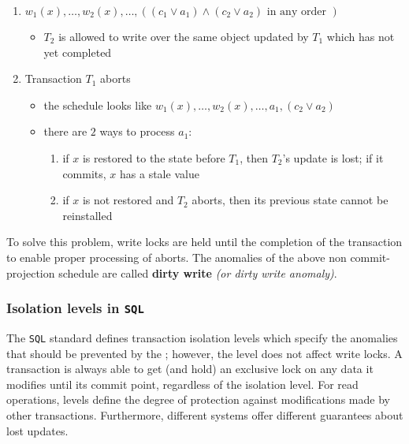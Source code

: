 \documentclass[english]{article}
\begin{document}
\begin{enumerate}
  \item \(w_1(x), \ldots, w_2(x), \ldots, \left( \left( c_1 \lor a_1 \right) \land \left( c_2 \lor a_2 \right) \text{ in any order }\right)\)
        \begin{itemize}[label=\(\rightarrow\)]
          \item \(T_2\) is allowed to write over the same object updated by \(T_1\) which has not yet completed
        \end{itemize}
  \item Transaction \(T_1\) aborts
        \begin{itemize}
          \item the schedule looks like \(w_1(x), \ldots, w_2(x), \ldots, a_1, \left( c_2 \lor a_2 \right)\)
          \item there are \(2\) ways to process \(a_1\):
                \begin{enumerate}[label=\arabic*.]
                  \item if \(x\) is restored to the state before \(T_1\), then \(T_2\)'s update is lost; if it commits, \(x\) has a stale value
                  \item if \(x\) is not restored and \(T_2\) aborts, then its previous state cannot be reinstalled
                \end{enumerate}
        \end{itemize}
\end{enumerate}

To solve this problem, write locks are held until the completion of the transaction to enable proper processing of aborts.
The anomalies of the above non commit-projection schedule are called \textbf{dirty write} \textit{(or dirty write anomaly)}.

\subsubsection{Isolation levels in \texttt{SQL}}

The \texttt{SQL} standard defines transaction isolation levels which specify the anomalies that should be prevented by the \dbms;
however, the level does not affect write locks.
A transaction is always able to get (and hold) an exclusive lock on any data it modifies until its commit point, regardless of the isolation level.
For read operations, levels define the degree of protection against modifications made by other transactions.
Furthermore, different systems offer different guarantees about lost updates.
\end{document}
